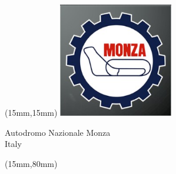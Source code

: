 \begin{textblock*}{50mm}(15mm,15mm)%
\includegraphics[width=50mm]{LG/2015-05-20_00086.png}
\par Autodromo Nazionale Monza\\ Italy
\end{textblock*}
\begin{textblock*}{185mm}(15mm,80mm)%
\end{textblock*}
